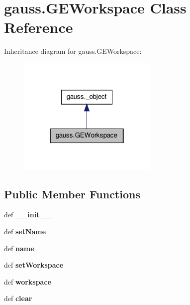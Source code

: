 \hypertarget{classgauss_1_1_g_e_workspace}{\section{gauss.\-G\-E\-Workspace Class Reference}
\label{classgauss_1_1_g_e_workspace}
}


Inheritance diagram for gauss.\-G\-E\-Workspace\-:\nopagebreak
\begin{figure}[H]
\begin{center}
\leavevmode
\includegraphics[width=190pt]{classgauss_1_1_g_e_workspace__inherit__graph}
\end{center}
\end{figure}
\subsection*{Public Member Functions}
\begin{DoxyCompactItemize}
\item 
\hypertarget{classgauss_1_1_g_e_workspace_a3e06ccc94a5fa68b7a27b4283e7460e1}{def {\bfseries \-\_\-\-\_\-init\-\_\-\-\_\-}}\label{classgauss_1_1_g_e_workspace_a3e06ccc94a5fa68b7a27b4283e7460e1}

\item 
\hypertarget{classgauss_1_1_g_e_workspace_a7ddc3aa6414c3d0654a463edeca9509f}{def {\bfseries set\-Name}}\label{classgauss_1_1_g_e_workspace_a7ddc3aa6414c3d0654a463edeca9509f}

\item 
\hypertarget{classgauss_1_1_g_e_workspace_aaa0f426eb5637256f6f289522e7071a5}{def {\bfseries name}}\label{classgauss_1_1_g_e_workspace_aaa0f426eb5637256f6f289522e7071a5}

\item 
\hypertarget{classgauss_1_1_g_e_workspace_ab9ac6c1fd7795221e416a0fad0e000c6}{def {\bfseries set\-Workspace}}\label{classgauss_1_1_g_e_workspace_ab9ac6c1fd7795221e416a0fad0e000c6}

\item 
\hypertarget{classgauss_1_1_g_e_workspace_a4bd40e0ef658a39611f8757d796b863c}{def {\bfseries workspace}}\label{classgauss_1_1_g_e_workspace_a4bd40e0ef658a39611f8757d796b863c}

\item 
\hypertarget{classgauss_1_1_g_e_workspace_a1a2acfd42fcb46bfbaa5c574bfcc6994}{def {\bfseries clear}}\label{classgauss_1_1_g_e_workspace_a1a2acfd42fcb46bfbaa5c574bfcc6994}

\end{DoxyCompactItemize}
